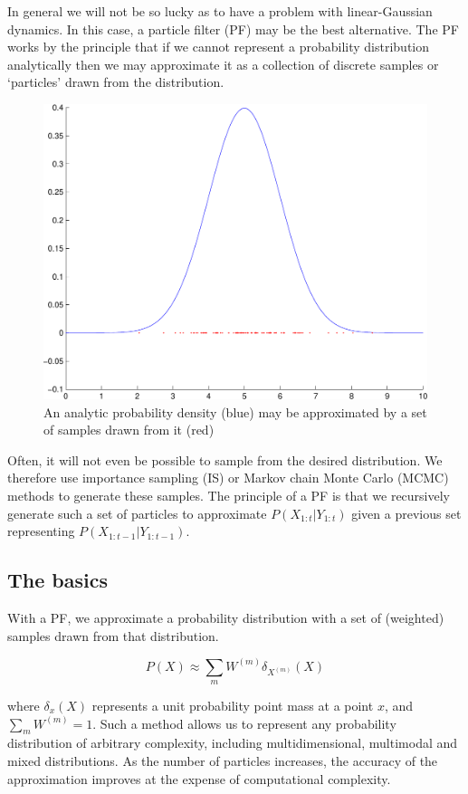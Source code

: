 In general we will not be so lucky as to have a problem with linear-Gaussian dynamics. In this case, a particle filter (PF) may be the best alternative. The PF works by the principle that if we cannot represent a probability distribution analytically then we may approximate it as a collection of discrete samples or `particles' drawn from the distribution.

\begin{figure} \centering
\includegraphics[width=0.7\columnwidth]{MonteCarlo-crop.pdf}%
\caption{An analytic probability density (blue) may be approximated by a set of samples drawn from it (red)}%
\label{fig:MonteCarlo}%
\end{figure}

Often, it will not even be possible to sample from the desired distribution. We therefore use importance sampling (IS) or Markov chain Monte Carlo (MCMC) methods to generate these samples. The principle of a PF is that we recursively generate such a set of particles to approximate $P(X_{1:t}|Y_{1:t})$ given a previous set representing $P(X_{1:t-1}|Y_{1:t-1})$.

\subsection{The basics}

With a PF, we approximate a probability distribution with a set of (weighted) samples drawn from that distribution.

\begin{equation}
P(X) \approx \sum_m{ W^{(m)} \delta_{X^{(m)}} (X)}
\label{eq:ParticleApprox}
\end{equation}

where $\delta_x (X)$ represents a unit probability point mass at a point $x$, and $\sum_m{W^{(m)}}=1$. Such a method allows us to represent any probability distribution of arbitrary complexity, including multidimensional, multimodal and mixed distributions. As the number of particles increases, the accuracy of the approximation improves at the expense of computational complexity.

